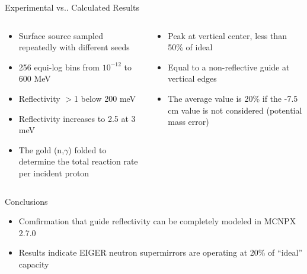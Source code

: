 \documentclass[final,t]{beamer}
\makeatletter
\DeclareRobustCommand\onedot{\futurelet\@let@token\@onedot}
\def\@onedot{\ifx\@let@token.\else.\null\fi\xspace}
\def\vs{{vs}\onedot}
\makeatother
\begin{document}
\begin{frame}{}
\begin{columns}[t]
\begin{column}{.3\linewidth}
\begin{block}{Experimental \vs Calculated Results}
\begin{columns}
      \end{columns}




      \begin{columns}

      \begin{column}{0.5\linewidth}

      \begin{itemize}
      \item Surface source sampled repeatedly with different seeds  
      \item 256 equi-log bins from $10^{-12}$ to 600 MeV
      \item Reflectivity \alert{$>$1} below 200 meV 
      \item Reflectivity increases to \alert{2.5} at 3 meV
      \item The gold (n,$\gamma$) folded to determine the total reaction rate per incident proton
      \end{itemize}

      \end{column}

      \begin{column}{0.5\linewidth}

      \begin{itemize}
      \item Peak at vertical center, less than \alert{50\%} of ideal
      \item Equal to a non-reflective guide at vertical edges
      \item The average value is \alert{20\%} if the -7.5 cm value is not considered (potential mass error)
      \end{itemize}

      \end{column}

      \end{columns}
      
      

      \end{block}


      \vspace{5ex}

      \begin{block}{\alert{Conclusions}}
        \begin{itemize}
        \item Comfirmation that guide reflectivity can be completely modeled in MCNPX 2.7.0
        \item Results indicate EIGER neutron supermirrors are operating at 20\% of ``ideal'' capacity 
        \end{itemize}
        \vspace{-1ex}
      \end{block}


\end{column}
\end{columns}
\end{frame}
\end{document}
